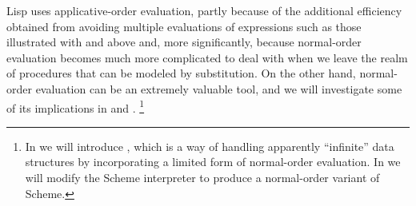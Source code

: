 Lisp uses applicative-order evaluation, partly because of the additional efficiency obtained from avoiding multiple evaluations of expressions such as those illustrated with  and  above and, more significantly, because normal-order evaluation becomes much more complicated to deal with when we leave the realm of procedures that can be modeled by substitution.
On the other hand, normal-order evaluation can be an extremely valuable tool, and we will investigate some of its implications in  and .%
\footnote{
	In  we will introduce , which is a way of handling apparently “infinite” data structures by incorporating a limited form of normal-order evaluation.
	In  we will modify the Scheme interpreter to produce a normal-order variant of Scheme.
}
